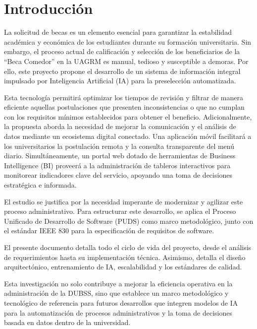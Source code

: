 \newpage
\section{Introducción}\label{sec:introduccion}

La solicitud de becas es un elemento esencial para garantizar la estabilidad académica y económica de los estudiantes durante su formación universitaria. Sin embargo, el proceso actual de calificación y selección de los beneficiarios de la \enquote{Beca Comedor} en la UAGRM es manual, tedioso y susceptible a demoras. Por ello, este proyecto propone el desarrollo de un sistema de información integral impulsado por Inteligencia Artificial (IA) para la preselección automatizada.

Esta tecnología permitirá optimizar los tiempos de revisión y filtrar de manera eficiente aquellas postulaciones que presenten inconsistencias o que no cumplan con los requisitos mínimos establecidos para obtener el beneficio. Adicionalmente, la propuesta aborda la necesidad de mejorar la comunicación y el análisis de datos mediante un ecosistema digital conectado. Una aplicación móvil facilitará a los universitarios la postulación remota y la consulta transparente del menú diario. Simultáneamente, un portal web dotado de herramientas de Business Intelligence (BI) proveerá a la administración de tableros interactivos para monitorear indicadores clave del servicio, apoyando una toma de decisiones estratégica e informada.

El estudio se justifica por la necesidad imperante de modernizar y agilizar este proceso administrativo. Para estructurar este desarrollo, se aplica el Proceso Unificado de Desarrollo de Software (PUDS) como marco metodológico, junto con el estándar IEEE 830 para la especificación de requisitos de software.

El presente documento detalla todo el ciclo de vida del proyecto, desde el análisis de requerimientos hasta su implementación técnica. Asimismo, detalla el diseño arquitectónico, entrenamiento de IA, escalabilidad y los estándares de calidad.

Esta investigación no solo contribuye a mejorar la eficiencia operativa en la administración de la DUBSS, sino que establece un marco metodológico y tecnológico de referencia para futuros desarrollos que integren modelos de IA para la automatización de procesos administrativos y la toma de decisiones basada en datos dentro de la universidad.
